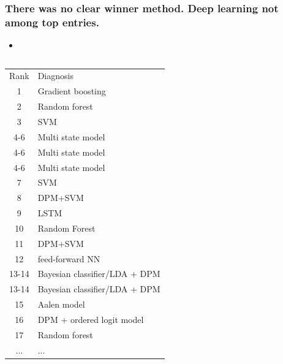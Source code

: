 \documentclass[8pt,xcolor=table,aspectratio=169]{beamer}
\begin{document}


\begin{frame}
\frametitle{There was no clear winner method. Deep learning not among top entries.}
 \begin{itemize}
\item {} 
\end{itemize}

\begin{columns}
\begin{column}[t]{0.5\textwidth}


\begin{table}
 \fontsize{6}{8}\selectfont
\begin{tabular}{c|>{\centering\arraybackslash}m{4cm}}
 \Xhline{2.5\arrayrulewidth}
                    Rank & Diagnosis \\
 \Xhline{2.5\arrayrulewidth}
 1 &  Gradient boosting \\
 2  &  Random forest \\
 3 &  SVM \\
 4-6  &  Multi state model\\
 4-6  &  Multi state model\\
 4-6 &  Multi state model\\
 7  &  SVM\\
  8 &  DPM+SVM \\
\rowcolor{benchmarkCol} 9 &  LSTM \\
 10 &   Random Forest \\
 11  &  DPM+SVM \\   
\rowcolor{benchmarkCol} 12  &  feed-forward NN \\
13-14  &  Bayesian classifier/LDA + DPM \\  
13-14 &  Bayesian classifier/LDA + DPM \\    
15 &  Aalen model \\
16  &  DPM + ordered logit model  \\
 17 &  Random forest \\
 ... & ...\\
\end{tabular}
\end{table} 



\end{column}
\end{columns}
\end{frame}
\end{document}
